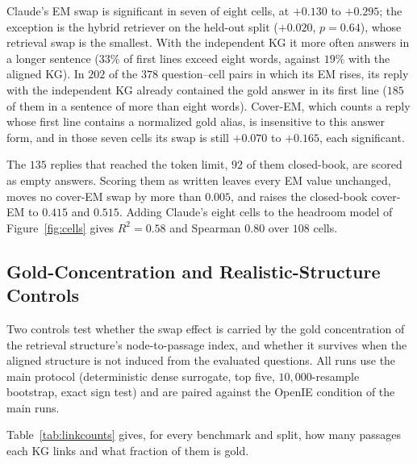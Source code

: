 \documentclass[11pt]{article}
\begin{document}
Claude's EM swap is significant in seven of eight cells, at $+0.130$ to $+0.295$; the exception is the hybrid retriever on the held-out split ($+0.020$, $p=0.64$), whose retrieval swap is the smallest. With the independent KG it more often answers in a longer sentence ($33\%$ of first lines exceed eight words, against $19\%$ with the aligned KG). In $202$ of the $378$ question--cell pairs in which its EM rises, its reply with the independent KG already contained the gold answer in its first line ($185$ of them in a sentence of more than eight words). Cover-EM, which counts a reply whose first line contains a normalized gold alias, is insensitive to this answer form, and in those seven cells its swap is still $+0.070$ to $+0.165$, each significant.

The $135$ replies that reached the token limit, $92$ of them closed-book, are scored as empty answers. Scoring them as written leaves every EM value unchanged, moves no cover-EM swap by more than $0.005$, and raises the closed-book cover-EM to $0.415$ and $0.515$. Adding Claude's eight cells to the headroom model of Figure~\ref{fig:cells} gives $R^2=0.58$ and Spearman $0.80$ over $108$ cells.

\subsection{Gold-Concentration and Realistic-Structure Controls}
\label{app:concentration}
Two controls test whether the swap effect is carried by the gold concentration of the retrieval structure's node-to-passage index, and whether it survives when the aligned structure is not induced from the evaluated questions. All runs use the main protocol (deterministic dense surrogate, top five, $10{,}000$-resample bootstrap, exact sign test) and are paired against the OpenIE condition of the main runs.

Table~\ref{tab:linkcounts} gives, for every benchmark and split, how many passages each KG links and what fraction of them is gold.

\begin{table}[ht]\centering\footnotesize
\setlength{\tabcolsep}{3pt}
\resizebox{\columnwidth}{!}{}
\caption{Passages linked by the aligned and independent KGs, and the gold fraction of the linked passages. Only on STaRK-Prime does the aligned KB link every passage, at the same gold fraction as the OpenIE KG.}
\label{tab:linkcounts}
\end{table}
\end{document}
